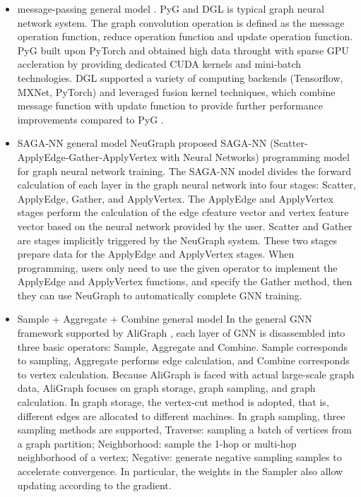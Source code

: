 \begin{itemize}
    \item message-passing general model \cite{gilmer_messgae_passing}. PyG and DGL is typical graph neural network system.
    The graph convolution operation is defined as the message operation function, reduce operation function and update operation function.
    PyG \cite{PyG} built upon PyTorch and obtained high data throught with sparse GPU accleration by providing dedicated CUDA kernels 
    and mini-batch technologies. DGL \cite{DGL} supported a variety of computing backends (Tensorflow, MXNet, PyTorch) and leveraged
    fusion kernel techniques, which combine message function with update function to provide further performance improvements compared to PyG \cite{PyG}. 
    \item SAGA-NN general model
    NeuGraph \cite{ma2019_neugraph} proposed SAGA-NN (Scatter-ApplyEdge-Gather-ApplyVertex with Neural Networks) programming model for graph neural network training.
    The SAGA-NN model divides the forward calculation of each layer in the graph neural network into four stages: Scatter, ApplyEdge, Gather, and ApplyVertex. 
    The ApplyEdge and ApplyVertex stages perform the calculation of the edge  cfeature vector and vertex feature vector based on the neural network provided by the user. 
    Scatter and Gather are stages implicitly triggered by the NeuGraph system. These two stages prepare data for the ApplyEdge and ApplyVertex stages. 
    When programming, users only need to use the given operator to implement the ApplyEdge and ApplyVertex functions, and specify the Gather method,
    then they can use NeuGraph to automatically complete GNN training.
    \item Sample + Aggregate + Combine general model
    In the general GNN framework supported by AliGraph \cite{zhu2019_aligraph}, 
    each layer of GNN is disassembled into three basic operators: Sample, Aggregate and Combine. 
    Sample corresponds to sampling, Aggregate performs edge calculation, 
    and Combine corresponds to vertex calculation. 
    Because AliGraph is faced with actual large-scale graph data, AliGraph focuses on graph storage, 
    graph sampling, and graph calculation. In graph storage, the vertex-cut method is adopted, 
    that is, different edges are allocated to different machines. 
    In graph sampling, three sampling methods are supported, 
    Traverse: sampling a batch of vertices from a graph partition;
    Neighborhood: sample the 1-hop or multi-hop neighborhood of a vertex;
    Negative: generate negative sampling samples to accelerate convergence. 
    In particular, the weights in the Sampler also allow updating according to the gradient.
\end{itemize}

